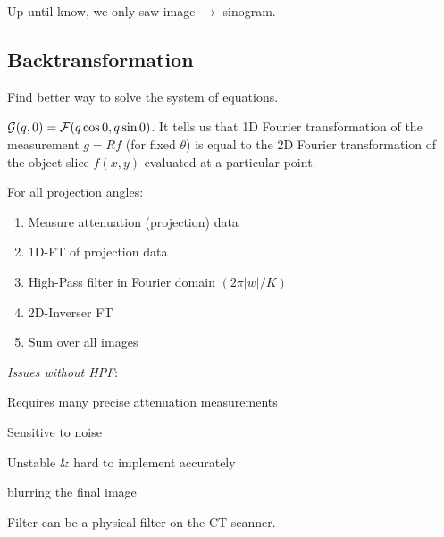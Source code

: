 \begin{theorem}
  Up until know, we only saw image \(\to\) sinogram.
\end{theorem}

\subsection{Backtransformation}
Find better way to solve the system of equations.

\begin{definition}
  \(\mathcal{G}(q, 0) = \operatorname{\mathcal{F}}(q \cos 0, q \sin 0)\). It tells us that 1D Fourier transformation of the measurement \(g = Rf\) (for fixed \(\theta\)) is equal to the 2D Fourier transformation of the object slice \(f(x, y)\) evaluated at a particular point.
\end{definition}

\begin{algorithm}
  For all projection angles:
  \begin{enumerate}
    \item Measure attenuation (projection) data
    \item 1D-FT of projection data
    \item High-Pass filter in Fourier domain \((2 \pi |w| / K)\)
    \item 2D-Inverser FT
    \item Sum over all images
  \end{enumerate}

  \textit{Issues without HPF}:
  \begin{itemize*}
    \item Requires many precise attenuation measurements
    \item Sensitive to noise
    \item Unstable \& hard to implement accurately
    \item blurring the final image
  \end{itemize*}

  Filter can be a physical filter on the CT scanner.
\end{algorithm}
